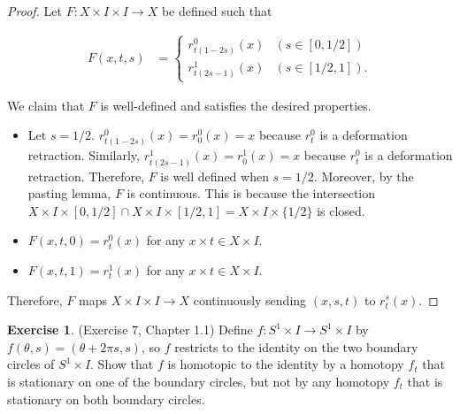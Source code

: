 \documentclass[12pt, psamsfonts]{amsart}
\theoremstyle{definition}
\newtheorem{exer}[thm]{Exercise}
\theoremstyle{remark}
\numberwithin{equation}{section}
\begin{document}
\begin{proof}
  Let $F: X \times I \times I \rightarrow X$ be defined such that

  \begin{align*}
    F(x, t, s) &= \begin{cases}
      r_{t(1 - 2s)}^0(x) & (s \in [0, 1/2]) \\
      r_{t(2s - 1)}^1(x) & (s \in [1/2, 1]).
    \end{cases}
  \end{align*}

  We claim that $F$ is well-defined and satisfies the desired properties.

  \begin{itemize}
    \item
      Let $s = 1 / 2$.
      $r_{t(1 - 2s)}^0(x) = r_0^0(x) = x$ because $r^0_t$ is a deformation retraction.
      Similarly, $r_{t(2s - 1)}^1(x) = r_0^1(x) = x$ because $r^0_t$ is a deformation retraction.
      Therefore, $F$ is well defined when $s = 1/2$.
      Moreover, by the pasting lemma, $F$ is continuous.
      This is because the intersection $X \times I \times [0, 1/2] \cap X \times I \times [1/2, 1] = X \times I \times \{ 1/2 \}$ is closed.
    \item
      $F(x, t, 0) = r_t^0(x)$ for any $x \times t \in X \times I$.
    \item
      $F(x, t, 1) = r_t^1(x)$ for any $x \times t \in X \times I$.
  \end{itemize}

  Therefore, $F$ maps $X \times I \times I \rightarrow X$ continuously sending $(x, s, t)$ to $r^s_t(x)$.
\end{proof}

\begin{exer}{(Exercise 7, Chapter 1.1)}
  Define $f: S^1 \times I \rightarrow S^1 \times I$ by $f(\theta, s) = (\theta + 2\pi s, s)$, so $f$ restricts to the identity on the two boundary circles of $S^1 \times I$.
  Show that $f$ is homotopic to the identity by a homotopy $f_t$ that is stationary on one of the boundary circles, but not by any homotopy $f_t$ that is stationary on both boundary circles.
\end{exer}
\end{document}
